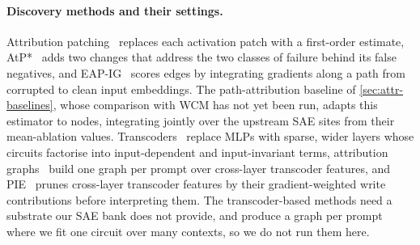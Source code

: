 \documentclass[10pt]{article}
\begin{document}
\paragraph{Discovery methods and their settings.}
Attribution patching~\citep{nanda2023attribution, syed2023attribution} replaces each activation patch with a first-order estimate, AtP*~\citep{kramar2024atp} adds two changes that address the two classes of failure behind its false negatives, and EAP-IG~\citep{hanna2024faith} scores edges by integrating gradients along a path from corrupted to clean input embeddings.
The path-attribution baseline of \cref{sec:attr-baselines}, whose comparison with WCM has not yet been run, adapts this estimator to nodes, integrating jointly over the upstream SAE sites from their mean-ablation values.
Transcoders~\citep{dunefsky2024transcoders} replace MLPs with sparse, wider layers whose circuits factorise into input-dependent and input-invariant terms, attribution graphs~\citep{ameisen2025circuit, lindsey2025biology} build one graph per prompt over cross-layer transcoder features, and PIE~\citep{chen2026pie} prunes cross-layer transcoder features by their gradient-weighted write contributions before interpreting them.
The transcoder-based methods need a substrate our SAE bank does not provide, and produce a graph per prompt where we fit one circuit over many contexts, so we do not run them here.
\end{document}

